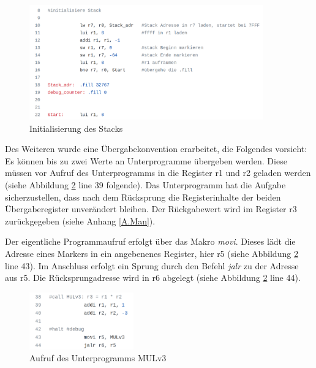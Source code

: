 \documentclass[fleqn, a4paper, 11pt]{article}       %
\begin{document}
\begin{figure}[h]
    \includegraphics[width =0.9\textwidth]{Stack_init.png}
\caption{Initialisierung des Stacks}
\label{fig:Stack}
\end{figure}

\newpage
\noindent Des Weiteren wurde eine Übergabekonvention erarbeitet, die Folgendes vorsieht: Es können bis zu zwei Werte an Unterprogramme übergeben werden. Diese müssen vor Aufruf des Unterprogramms in die Register r1 und r2 geladen werden (siehe Abbildung \ref{fig:FKT} line 39 folgende). Das Unterprogramm hat die Aufgabe sicherzustellen, dass nach dem Rücksprung die Registerinhalte der beiden Übergaberegister unverändert bleiben. Der Rückgabewert wird im Register r3 zurückgegeben (siehe Anhang \ref{A.Man}).

Der eigentliche Programmaufruf erfolgt über das Makro \emph{movi}. Dieses lädt die Adresse eines Markers in ein angebenenes Register, hier r5 (siehe Abbildung \ref{fig:FKT} line 43). Im Anschluss erfolgt ein Sprung durch den Befehl \emph{jalr} zu der Adresse aus r5. Die Rücksprungadresse wird in r6 abgelegt (siehe Abbildung \ref{fig:FKT} line 44).

\begin{figure}[h]
    \includegraphics[width =0.4\textwidth]{Funktionsaufruf.png}
\caption{Aufruf des Unterprogramms MULv3}
\label{fig:FKT}
\end{figure}
\end{document}
